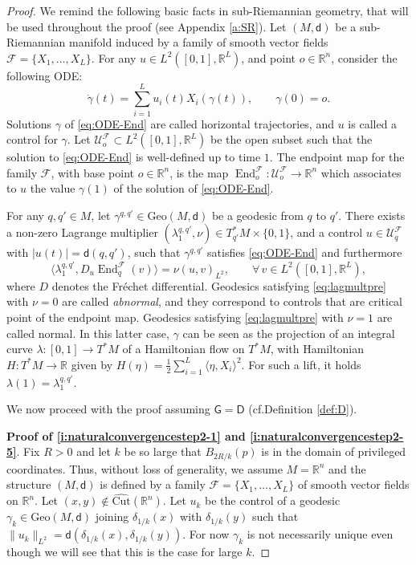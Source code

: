\documentclass[11pt,a4paper]{article}
\theoremstyle{plain}
\theoremstyle{definition}
\theoremstyle{remark}
\numberwithin{equation}{section}
\newcommand{\R}{\mathbb{R}} %
\newcommand{\Cut}{\mathrm{Cut}}
\DeclareMathOperator{\End}{\mathrm{End}}
\newcommand{\Geo}{\mathrm{Geo}}
\newcommand{\sfd}{\mathsf d}
\newcommand{\sfD}{\mathsf D}
\newcommand{\sfG}{\mathsf G}
\begin{document}
\begin{proof}
We remind the following basic facts in sub-Riemannian geometry, that will be used throughout the proof (see Appendix \ref{a:SR}). Let $(M,\sfd)$ be a sub-Riemannian manifold induced by a family of smooth vector fields $\mathscr{F} = \{X_1,\dots,X_L\}$. For any $u\in L^2([0,1],\R^L)$, and point $o\in \R^n$, consider the following ODE:
\begin{equation}\label{eq:ODE-End}
\dot{\gamma}(t) = \sum_{i=1}^L u_i(t) X_i(\gamma(t)), \qquad \gamma(0) = o.
\end{equation}
Solutions $\gamma$ of \eqref{eq:ODE-End} are called horizontal trajectories, and $u$ is called a control for $\gamma$. Let $\mathcal{U}_o^{\mathscr{F}} \subset L^2([0,1],\R^L)$ be the open subset such that the solution to \eqref{eq:ODE-End} is well-defined up to time $1$. The endpoint map for the family $\mathscr{F}$, with base point $o\in \R^n$, is the map $\End_o^{\mathscr{F}} : \mathcal{U}_o^{\mathscr{F}}  \to \R^n$ which associates to $u$ the value $\gamma(1)$ of the solution of \eqref{eq:ODE-End}.

For any $q,q'\in M$, let $\gamma^{q,q'} \in \Geo(M,\sfd)$ be a geodesic from $q$ to $q'$. There exists a non-zero Lagrange multiplier $(\lambda^{q,q'}_1,\nu)\in T_{q'}^*M\times \{0,1\}$, and a control $u\in \mathcal{U}_q^{\mathscr{F}}$ with $|u(t)| = \sfd(q,q')$, such that $\gamma^{q,q'}$ satisfies \eqref{eq:ODE-End} and furthermore
\begin{equation}\label{eq:lagmultpre}
\langle \lambda^{q,q'}_1 , D_{u} \End_{q}^{\mathscr{F}} (v)\rangle = \nu (u,v)_{L^2},\qquad \forall\, v\in L^2([0,1],\R^L),
\end{equation}
where $D$ denotes the Fréchet differential. Geodesics satisfying \eqref{eq:lagmultpre} with $\nu=0$ are called \emph{abnormal}, and they correspond to controls that are critical point of the endpoint map. Geodesics satisfying \eqref{eq:lagmultpre} with $\nu=1$ are called normal. In this latter case, $\gamma$ can be seen as the projection of an integral curve $\lambda :[0,1]\to T^*M$ of a Hamiltonian flow on $T^*M$, with Hamiltonian $H:T^*M\to \R$ given by $H(\eta) = \tfrac{1}{2}\sum_{i=1}^L \langle \eta,X_i\rangle^2$. For such a lift, it holds $\lambda(1) = \lambda_1^{q,q'}$.

We now proceed with the proof assuming $\sfG= \sfD$ (cf.\@ Definition \ref{def:D}).
 
\textbf{Proof of \ref{i:naturalconvergencestep2-1} and \ref{i:naturalconvergencestep2-5}}. Fix $R>0$ and let $k$ be so large that $B_{2R/k}(p)$ is in the domain of privileged coordinates. Thus,  without loss of generality, we assume $M=\R^n$ and the structure $(M,\sfd)$ is defined by a family $\mathscr{F} = \{X_1,\dots,X_L\}$ of smooth vector fields on $\R^n$. Let $(x,y)\notin \widehat{\Cut}(\R^n)$. Let $u_k$ be the control of a geodesic $\gamma_k \in \Geo(M,\sfd)$ joining $\delta_{1/k}(x)$ with $\delta_{1/k}(y)$ such that $\|u_k\|_{L^2} = \sfd(\delta_{1/k}(x),\delta_{1/k}(y))$. For now $\gamma_k$ is not necessarily unique even though we will see that this is the case for large $k$.


\end{proof}
\end{document}
